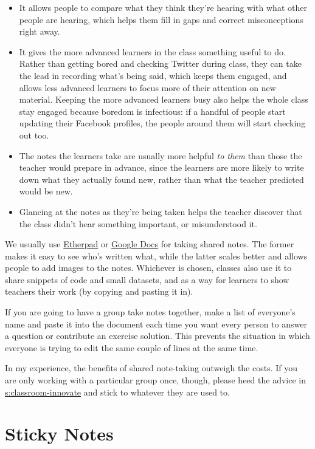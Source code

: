 \begin{itemize}
\item
  It allows people to compare what they think they're hearing with
  what other people are hearing, which helps them fill in gaps and
  correct misconceptions right away.
\item
  It gives the more advanced learners in the class something useful to
  do. Rather than getting bored and checking Twitter during class,
  they can take the lead in recording what's being said, which keeps
  them engaged, and allows less advanced learners to focus more of
  their attention on new material. Keeping the more advanced learners
  busy also helps the whole class stay engaged because boredom is
  infectious: if a handful of people start updating their Facebook
  profiles, the people around them will start checking out too.
\item
  The notes the learners take are usually more helpful \emph{to them} than
  those the teacher would prepare in advance, since the learners are
  more likely to write down what they actually found new, rather than
  what the teacher predicted would be new.
\item
  Glancing at the notes as they're being taken helps the teacher
  discover that the class didn't hear something important, or
  misunderstood it.
\end{itemize}

We usually use \href{http://etherpad.org}{Etherpad} or \href{http://docs.google.com}{Google Docs} for
taking shared notes. The former makes it easy to see who's written
what, while the latter scales better and allows people to add images
to the notes. Whichever is chosen, classes also use it to share
snippets of code and small datasets, and as a way for learners to show
teachers their work (by copying and pasting it in).

If you are going to have a group take notes together, make a list of
everyone's name and paste it into the document each time you want every
person to answer a question or contribute an exercise solution. This
prevents the situation in which everyone is trying to edit the same
couple of lines at the same time.

In my experience, the benefits of shared note-taking outweigh the costs.
If you are only working with a particular group once, though, please
heed the advice in \protect\hyperlink{SECTION}{s:classroom-innovate} and stick to
whatever they are used to.

\section{Sticky Notes}\label{s:classroom-sticky-notes}

